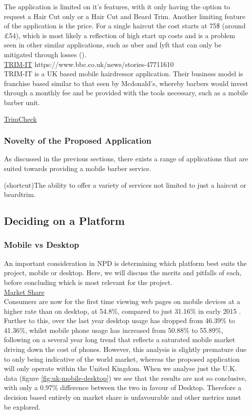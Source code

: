 \documentclass[12pt]{article}
\begin{document}
	The application is limited on it's features, with it only having the option to request a Hair Cut only or a Hair Cut and Beard Trim. 
	Another limiting feature of the application is the price. For a single haircut the cost starts at 75\$ (around £54), which is most likely a reflection of high start up costs and is a problem seen in other similar applications, such as uber and lyft that can only be mitigated through losses (\cite{WillRidehailingProfits}).
	\\
	
	\noindent
	\underline{TRIM-IT}
	https://www.bbc.co.uk/news/stories-47711610
	\\
	TRIM-IT is a UK based mobile hairdressor application. Their business model is franchise based similar to that seen by Mcdonald's, whereby barbers would invest through a monthly fee and be provided with the tools necessary, such as a mobile barber unit. 
	
	\noindent
	\underline{TrimCheck}
	
	
	\subsubsection{Novelty of the Proposed Application}
	As discussed in the previous sections, there exists a range of applications that are suited towards providing a mobile barber service.
	
	(shortcut)The ability to offer a variety of services not limited to just a haircut or beardtrim.
	
	\subsection{Deciding on a Platform}
	\subsubsection{Mobile vs Desktop}
	An important consideration in NPD is determining which platform best suits the project, mobile or desktop. Here, we will discuss the merits and pitfalls of each, before concluding which is most relevant for the project. 
	\\
	
	\noindent
	\underline{Market Share}
	\\
	\noindent
	Consumers are now for the first time viewing web pages on mobile devices at a higher rate than on desktop, at 54.8\%, compared to just 31.16\% in early 2015 \cite{MobilePercentageWebsite2021}. Further to this, over the last year desktop usage has dropped from 46.39\% to 41.36\%, whilst mobile phone usage has increased from 50.88\% to 55.89\%, following on a several year long trend \cite{DesktopVsMobile2021} that reflects a saturated mobile market driving down the cost of phones. However, this analysis is slightly premature due to only being indicative of the world market, whereas the proposed application will only operate within the United Kingdom. When we analyse just the U.K. data (figure \ref{fig:uk-mobile-desktop}) we see that the results are not so conclusive, with only a 0.97\% difference between the two in favour of Desktop. Therefore a decision based entirely on market share is unfavourable and other metrics must be explored.
	
\end{document}
